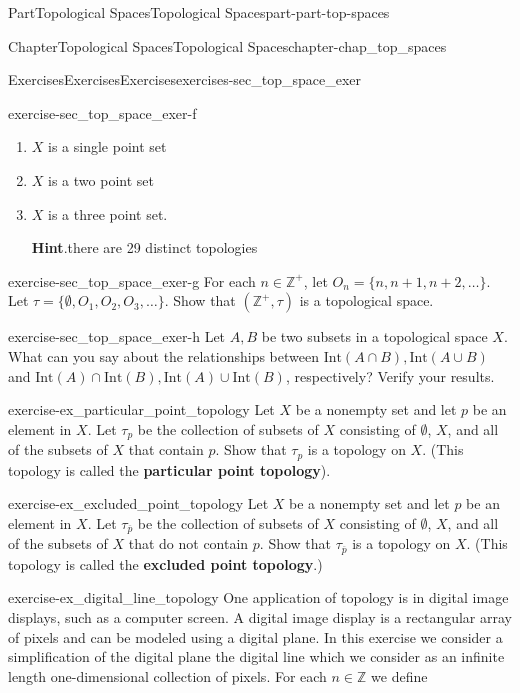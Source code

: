 \documentclass[oneside,10pt,]{book}
\newcommand{\blocktitlefont}{\relax}
\newcommand{\terminology}[1]{\textbf{#1}}
\numberwithin{equation}{chapter}
\newcommand{\Z}{\mathbb{Z}}
\newcommand{\Int}{\text{Int}}
\begin{document}
\begin{partptx}{Part}{Topological Spaces}{}{Topological Spaces}{}{}{part-part-top-spaces}
\begin{chapterptx}{Chapter}{Topological Spaces}{}{Topological Spaces}{}{}{chapter-chap_top_spaces}
\begin{exercises-section}{Exercises}{Exercises}{}{Exercises}{}{}{exercises-sec_top_space_exer}
\begin{divisionexercise}{6}{}{}{exercise-sec_top_space_exer-f}
\begin{enumerate}[font=\bfseries,label=(\alph*),ref=\alph*]%
\item{}\(X\) is a single point set%
\item{}\(X\) is a two point set%
\item{}\(X\) is a three point set.%
\par\smallskip%
\noindent\textbf{\blocktitlefont Hint}.\hypertarget{hint-sec_top_space_exer-f-d-b}{}\quad{}there are 29 distinct topologies%
\end{enumerate}%
\end{divisionexercise}%
\begin{divisionexercise}{7}{}{}{exercise-sec_top_space_exer-g}%
For each \(n \in \Z^+\), let \(O_n = \{n, n+1, n+2, \ldots\}\). Let \(\tau = \{\emptyset, O_1, O_2, O_3, \ldots\}\). Show that \((\Z^+, \tau)\) is a topological space.%
\end{divisionexercise}%
\begin{divisionexercise}{8}{}{}{exercise-sec_top_space_exer-h}%
Let \(A, B\) be two subsets in a topological space \(X\). What can you say about the relationships between \(\Int(A\cap B), \Int(A\cup B)\) and \(\Int(A)\cap \Int(B), \Int(A)\cup \Int(B)\), respectively? Verify your results.%
\end{divisionexercise}%
\begin{divisionexercise}{9}{}{}{exercise-ex_particular_point_topology}%
Let \(X\) be a nonempty set and let \(p\) be an element in \(X\). Let \(\tau_p\) be the collection of subsets of \(X\) consisting of \(\emptyset\), \(X\), and all of the subsets of \(X\) that contain \(p\). Show that \(\tau_p\) is a topology on \(X\). (This topology is called the \terminology{particular point topology}). %
\end{divisionexercise}%
\begin{divisionexercise}{10}{}{}{exercise-ex_excluded_point_topology}%
%
Let \(X\) be a nonempty set and let \(p\) be an element in \(X\). Let \(\tau_{\overline{p}}\) be the collection of subsets of \(X\) consisting of \(\emptyset\), \(X\), and all of the subsets of \(X\) that do not contain \(p\). Show that \(\tau_{\overline{p}}\) is a topology on \(X\). (This topology is called the \terminology{excluded point topology}.)%
\end{divisionexercise}%
\begin{divisionexercise}{11}{}{}{exercise-ex_digital_line_topology}%
One application of topology is in digital image displays, such as a computer screen. A digital image display is a rectangular array of pixels and can be modeled using a digital plane. In this exercise we consider a simplification of the digital plane \textemdash{} the digital line \textemdash{} which we consider as an infinite length one-dimensional collection of pixels. For each \(n \in \Z\) we define%

\end{divisionexercise}
\end{exercises-section}
\end{chapterptx}
\end{partptx}
\end{document}

